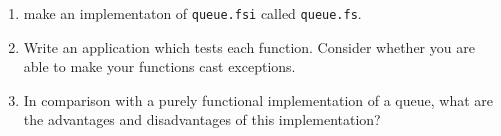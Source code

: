 \begin{enumerate}
\item make an implementaton of \lstinline[language=console]{queue.fsi} called \lstinline[language=console]{queue.fs}.
\item Write an application which tests each function. Consider whether you are able to make your functions cast exceptions.
\item In comparison with a purely functional implementation of a queue, what are the advantages and disadvantages of this implementation?
\end{enumerate}
